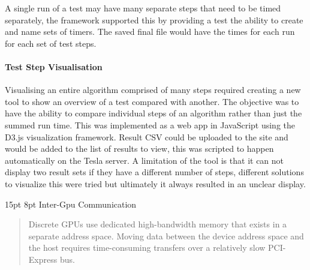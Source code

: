 \documentclass[12pt,a4paper]{article}
\makeatletter
\renewcommand\subsection{\@startsection {subsection}{1}{2mm} %
                               {15pt} %
                               {8pt} %
                               {\fontsize{13pt}{1em}\bfseries}}
\makeatother
\begin{document}
A single run of a test may have many separate steps that need to be timed separately, the framework supported this by providing a test the ability to create and name sets of timers. The saved final file would have the times for each run for each set of test steps. 

\paragraph{Test Step Visualisation}
Visualising an entire algorithm comprised of many steps required creating a new tool to show an overview of a test compared with another. The objective was to have the ability to compare individual steps of an algorithm rather than just the summed run time. This was implemented as a web app in JavaScript using the D3.js visualization framework. Result CSV could be uploaded to the site and would be added to the list of results to view, this was scripted to happen automatically on the Tesla server.
A limitation of the tool is that it can not display two result sets if they have a different number of steps, different solutions to visualize this were tried but ultimately it always resulted in an unclear display. 

\subsection{Inter-Gpu Communication}
\blockquote[\cite{amdoclguide}]{Discrete GPUs use dedicated high-bandwidth memory that exists in a separate address space. Moving data between the device address space and the host requires time-consuming transfers over a relatively slow PCI-Express bus.
}
\end{document}
